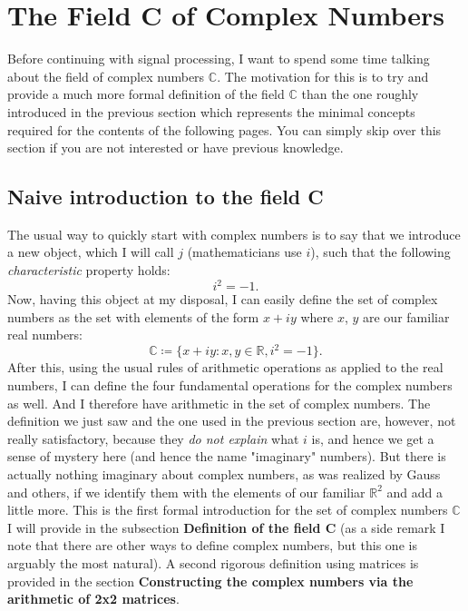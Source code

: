 \documentclass[12pt,oneside,openany]{memoir}
\numberwithin{equation}{subsection}
\begin{document}
\newpage
\section{The Field C of Complex Numbers}
Before continuing with signal processing, I want to spend some time talking
about the field of complex numbers $\mathbb{C}$. The motivation for this is to
try and provide a much more formal definition of the field $\mathbb{C}$ than the
one roughly introduced in the previous section which represents the minimal
concepts required for the contents of the following pages. You can simply skip
over this section if you are not interested or have previous knowledge.


\subsection{Naive introduction to the field C}
The usual way to quickly start with complex numbers is to say that we introduce
a new object, which I will call $j$ (mathematicians use $i$), such that the
following \textit{characteristic} property holds:
\[
	i^2 = -1.
\]
Now, having this object at my disposal, I can easily define the set of complex
numbers as the set with elements of the form $x + iy$ where $x$, $y$ are our
familiar real numbers:
\[
	\mathbb{C} \coloneqq \{x + iy : x,y \in \mathbb{R}, i^2 = -1\}.
\]
After this, using the usual rules of arithmetic operations as applied to the
real numbers, I can define the four fundamental operations for the complex
numbers as well. And I therefore have arithmetic in the set of complex numbers.
\bigbreak\noindent
The definition we just saw and the one used in the previous section are,
however, not really satisfactory, because they \textit{do not explain} what
$i$ is, and hence we get a sense of mystery here (and hence the name "imaginary"
numbers). But there is actually nothing imaginary about complex numbers, as was
realized by Gauss and others, if we identify them with the elements of our
familiar $\mathbb{R}^2$ and add a little more. This is the first formal
introduction for the set of complex numbers $\mathbb{C}$ I will provide in the
subsection \textbf{Definition of the field C} (as a side remark I note that
there are other ways to define complex numbers, but this one is arguably the
most natural). A second rigorous definition using matrices is provided in the
section \textbf{Constructing the complex numbers via the arithmetic of 2x2
matrices}.
\end{document}
